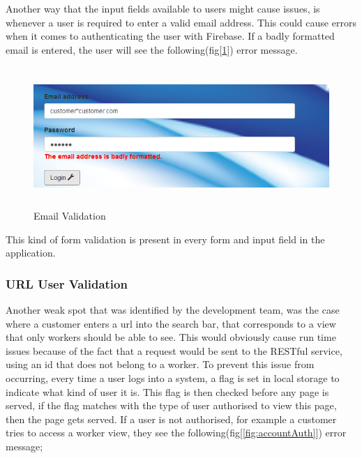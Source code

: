 \bigskip

Another way that the input fields available to users might cause issues, is whenever a user is required to enter a valid email address. This could cause errors when it comes to authenticating the user with Firebase. If a badly formatted email is entered, the user will see the following(fig[\ref{fig:email}]) error message.

\begin{figure}[H]
    \centering
    \includegraphics[width=\textwidth, height=150pt]{img/email.PNG}
    \caption{Email Validation}
    \label{fig:email}
\end{figure}

\bigskip

This kind of form validation is present in every form and input field in the application.

\bigskip

\subsubsection{URL User Validation}

Another weak spot that was identified by the development team, was the case where a customer enters a url into the search bar, that corresponds to a view that only workers should be able to see. This would obviously cause run time issues because of the fact that a request would be sent to the RESTful service, using an id that does not belong to a worker. To prevent this issue from occurring, every time a user logs into a system, a flag is set in local storage to indicate what kind of user it is. This flag is then checked before any page is served, if the flag matches with the type of user authorised to view this page, then the page gets served. If a user is not authorised, for example a customer tries to access a worker view, they see the following(fig[\ref{fig:accountAuth}]) error message;

